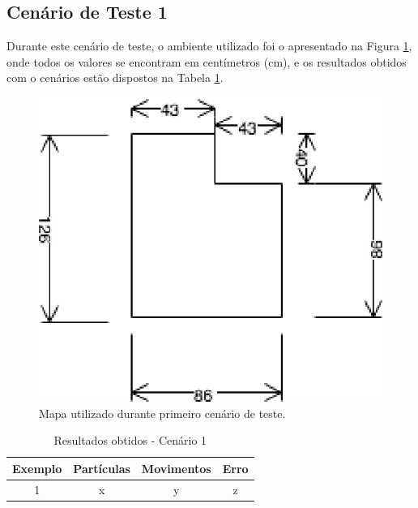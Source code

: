 \subsection{Cenário de Teste 1}

Durante este cenário de teste, o ambiente utilizado foi o apresentado na Figura \ref{img:map1}, onde todos os
valores se encontram em centímetros (cm), e os resultados obtidos com o cenários estão dispostos na Tabela \ref{tab:cen1}.

\begin{figure}[H]
	\centering
	\includegraphics[scale=1.3]{figuras/map1.eps}
	\caption[Primeiro Cenário de Teste]{Mapa utilizado durante primeiro cenário de teste.}
	\label{img:map1}
\end{figure}

\begin{table}[H]
  \centering
  \caption{Resultados obtidos - Cenário 1}
  \label{tab:cen1}
  \begin{tabular}{|c|c|c|c|}
  \hline
  \textbf{Exemplo} & \textbf{Partículas} & \textbf{Movimentos} & \textbf{Erro} \\ \hline
  1                & x                   & y                   & z             \\ \hline
  \end{tabular}
\end{table}
